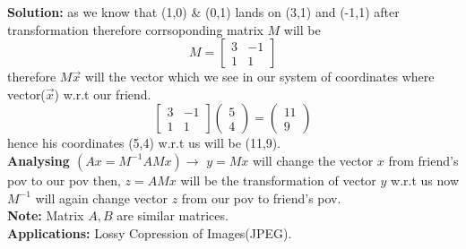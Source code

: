 \documentclass[a4paper,11pt]{article}
\numberwithin{equation}{section}
\begin{document}
\begin{itemize}
\textbf{Solution:} as we know that (1,0) \& (0,1) lands on (3,1) and (-1,1) after transformation therefore corrsoponding matrix $M$ will be
\[M=\begin{bmatrix}
    3&-1\\1&1
\end{bmatrix}\]
therefore $M\vec{x}$ will the vector which we see in our system of coordinates where vector($\vec{x}$) w.r.t our friend. 
\[
\begin{bmatrix}
    3&-1\\1&1
\end{bmatrix}\begin{pmatrix}
    5\\4
\end{pmatrix}=\begin{pmatrix}
    11\\9
\end{pmatrix}
\]
hence his coordinates (5,4) w.r.t us will be (11,9).\\

\textbf{Analysing $(Ax=M^{-1}AMx )\longrightarrow$} $y=Mx$ will change the vector $x$ from friend's pov to our pov then, $z=AMx$ will be the transformation of vector $y$ w.r.t us now $M^{-1}$ will again change vector $z$ from our pov to friend's pov.\\

\textbf{Note: }Matrix $A,B$ are similar matrices.\\
\textbf{Applications: }Lossy Copression of Images(JPEG).


\end{itemize}
\end{document}
